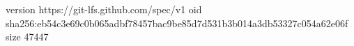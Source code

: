 version https://git-lfs.github.com/spec/v1
oid sha256:eb54c3e69c0b065adbf78457bac9be85d7d531b3b014a3db53327c054a62e06f
size 47447
